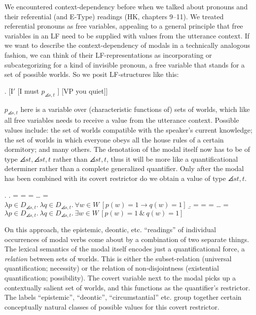 We encountered context-dependency before when we talked about pronouns and their referential (and E-Type) readings (H\amp K, chapters 9--11). We treated referential pronouns as free variables, appealing to a general principle that free variables in an LF need to be supplied with values from the utterance context. If we want to describe the context-dependency of modals in a technically analogous fashion, we can think of their LF-representations as incorporating or subcategorizing for a kind of invisible pronoun, a free variable that stands for a set of possible worlds. So we posit LF-structures like this:

\exi. \label{newlf} [I$'$ [I must $p_{\angles{s,t}}$ ] [VP you quiet]]

$p_{\angles{s,t}}$ here is a variable over (characteristic functions of) sets of worlds, which \dash like all free variables \dash needs to receive a value from the utterance context. Possible values include: the set of worlds compatible with the speaker's current knowledge; the set of worlds in which everyone obeys all the house rules of a certain dormitory; and many others. The denotation of the modal itself now has to be of type $\angles{st,\angles{st,t}}$ rather than $\angles{st,t}$, thus it will be more like a quantificational determiner rather than a complete generalized quantifier. Only after the modal has been combined with its covert restrictor do we obtain a value of type $\angles{st,t}$.

\ex. \a.  =  =  = \dots{} =\\
$\lambda p\in D_{\angles{s,t}}.\ \lambda q\in D_{\angles{s,t}}.\ \forall w\in W\ [p(w)=1 \rightarrow q(w)=1]$
\b.  =  =  = \dots{} =\\
$\lambda p\in D_{\angles{s,t}}.\ \lambda q\in D_{\angles{s,t}}.\ \exists w\in W\ [p(w)=1\ \&\ q(w)=1]$

On this approach, the epistemic, deontic, etc. ``readings'' of individual occurrences of modal verbs come about by a combination of two separate things. The lexical semantics of the modal itself encodes just a quantificational force, a \emph{relation} between sets of worlds. This is either the subset-relation (universal quantification; necessity) or the relation of non-disjointness (existential quantification; possibility). The covert variable next to the modal picks up a contextually salient set of worlds, and this functions as the quantifier's restrictor. The labels ``epistemic'', ``deontic'', ``circumstantial'' etc. group together certain conceptually natural classes of possible values for this covert restrictor.


